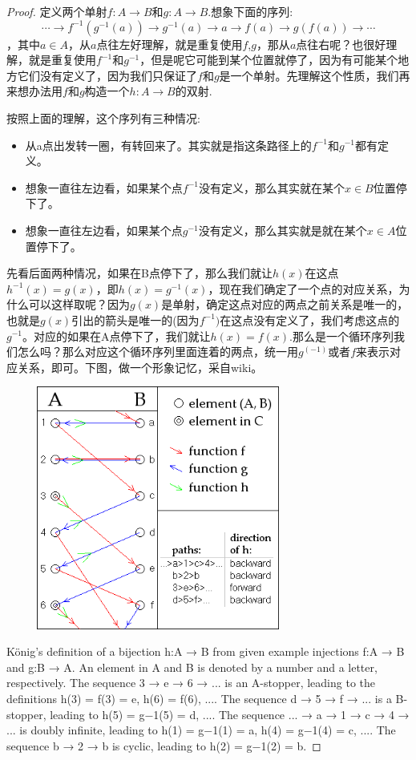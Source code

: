 \documentclass{article}
\newcommand*{\xfunc}[4]{{#2}\colon{#3}{#1}{#4}}
\newcommand*{\func}[3]{\xfunc{\to}{#1}{#2}{#3}}
\begin{document}
\begin{proof}
定义两个单射$\func{f}{A}{B}$和$\func{g}{A}{B}$.想象下面的序列:\[\cdots \rightarrow  f^{-1}(g^{-1}(a)) \rightarrow g^{-1}(a) \rightarrow   a  \rightarrow  f(a) \rightarrow  g(f(a)) \rightarrow \cdots\]，其中$a \in A$，从$a$点往左好理解，就是重复使用$f$,$g$，那从$a$点往右呢？也很好理解，就是重复使用$f^{-1}$和$g^{-1}$，但是呢它可能到某个位置就停了，因为有可能某个地方它们没有定义了，因为我们只保证了$f$和$g$是一个单射。先理解这个性质，我们再来想办法用$f$和$g$构造一个$\func{h}{A}{B}$的双射.

按照上面的理解，这个序列有三种情况:
\begin{itemize}
	\item 从a点出发转一圈，有转回来了。其实就是指这条路径上的$f^{-1}$和$g^{-1}$都有定义。
	\item 想象一直往左边看，如果某个点$f^{-1}$没有定义，那么其实就在某个$x \in B$位置停下了。
	\item 想象一直往左边看，如果某个点$g^{-1}$没有定义，那么其实就是就在某个$x \in A$位置停下了。	
\end{itemize}

先看后面两种情况，如果在B点停下了，那么我们就让$h(x)$在这点$h^{-1}(x)=g(x)$，即$h(x)=g^{-1}(x)$，现在我们确定了一个点的对应关系，为什么可以这样取呢？因为$g(x)$是单射，确定这点对应的两点之前关系是唯一的，也就是$g(x)$引出的箭头是唯一的(因为$f^{-1})$在这点没有定义了，我们考虑这点的$g^{-1}$。对应的如果在A点停下了，我们就让$h(x)=f(x)$.那么是一个循环序列我们怎么吗？那么对应这个循环序列里面连着的两点，统一用$g^(-1)$或者$f$来表示对应关系，即可。下图，做一个形象记忆，采自wiki。

\begin{center}
\includegraphics[width=10cm, height=8cm]{images/Cantor-Bernstein.png}
\end{center}

König's definition of a bijection h:A → B from given example injections f:A → B and g:B → A. An element in A and B is denoted by a number and a letter, respectively. The sequence 3 → e → 6 → ... is an A-stopper, leading to the definitions h(3) = f(3) = e, h(6) = f(6), .... The sequence d → 5 → f → ... is a B-stopper, leading to h(5) = g−1(5) = d, .... The sequence ... → a → 1 → c → 4 → ... is doubly infinite, leading to h(1) = g−1(1) = a, h(4) = g−1(4) = c, .... The sequence b → 2 → b is cyclic, leading to h(2) = g−1(2) = b.

\end{proof}
\end{document}
